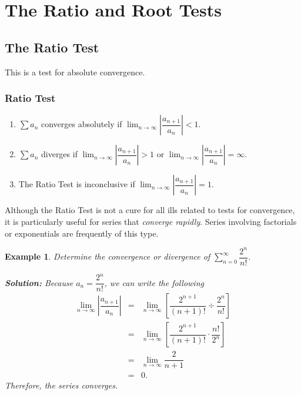 \documentclass[titlepage,a4paper,12pt]{report}
\newtheorem{example}{Example}[section]
\begin{document}
\section{The Ratio and Root Tests}
\subsection{The Ratio Test}
This is a test for absolute convergence.
\subsubsection{Ratio Test}
\begin{enumerate}
\item $\displaystyle \sum a_n$ converges absolutely if $\displaystyle \lim _{n\rightarrow \infty}\left|\dfrac{a_{n+1}}{a_n}\right|<1$.
\item $\displaystyle \sum a_n$ diverges if $\displaystyle \lim _{n\rightarrow \infty}\left|\dfrac{a_{n+1}}{a_n}\right|>1$ or $\displaystyle \lim _{n\rightarrow \infty}\left|\dfrac{a_{n+1}}{a_n}\right|=\infty$.
\item The Ratio Test is inconclusive if $\displaystyle \lim _{n\rightarrow \infty}\left|\dfrac{a_{n+1}}{a_n}\right|=1$.
\end{enumerate}
Although the Ratio Test is not a cure for all ills related to tests for convergence, it is particularly useful for series that \textit{converge rapidly}. Series involving factorials or exponentials are frequently of this type. 
\begin{example}
Determine the convergence or divergence of $\displaystyle \sum _{n=0}^\infty \dfrac{2^n}{n!}$.

\noindent \textbf{Solution:} Because $a_n=\dfrac{2^n}{n!}$, we can write the following 
\begin{eqnarray*}
\lim _{n\rightarrow \infty}\left|\dfrac{a_{n+1}}{a_n}\right| &=& \lim _{n\rightarrow \infty} \left[\dfrac{2^{n+1}}{(n+1)!}\div \dfrac{2^n}{n!}\right]\\
&=& \lim _{n\rightarrow \infty} \left[\dfrac{2^{n+1}}{(n+1)!}\cdot \dfrac{n!}{2^n}\right]\\
&=& \lim _{n\rightarrow \infty} \dfrac{2}{n+1} \\
&=& 0.
\end{eqnarray*}
Therefore, the series converges.
\end{example}
\end{document}
